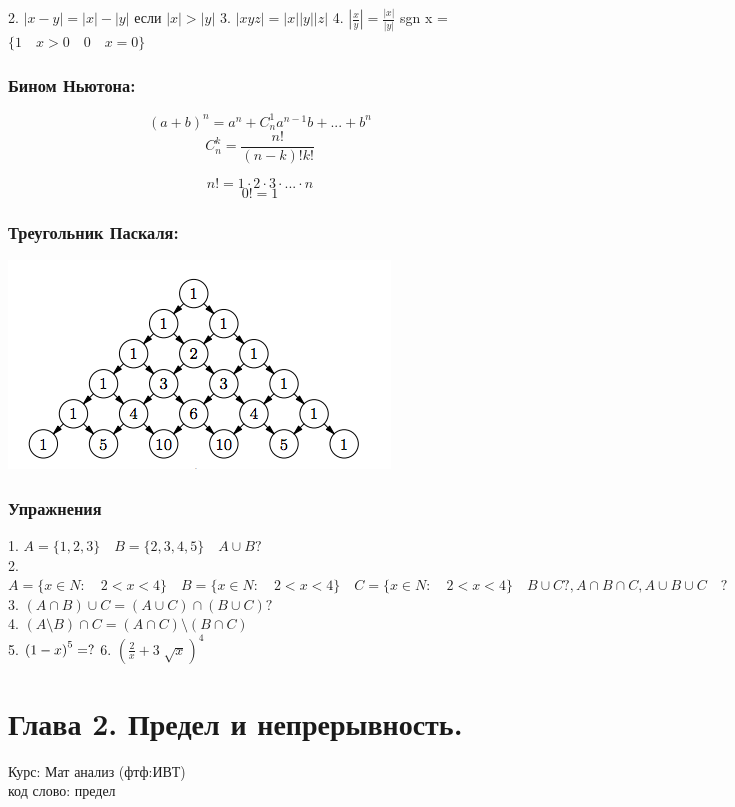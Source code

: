 \documentclass[a4paper, 12pt]{article}
\begin{document}
2. $  |x - y|= |x| - |y|$ если $ |x| > |y| $
3. $ |xyz| = |x||y||z| $
4. $ \left| \frac{x}{y}\right| =  \frac{|x|}{|y|}$
sgn x = $ \{ 1 \quad x>0 \quad 0 \quad x=0\} $\\

\subsubsection*{Бином Ньютона:}
\[
	\left( a + b\right)^n = a^n + C_n^1 a^{n-1}b +...+b^n	
\]
\[
	C_n^k = \frac{n!}{(n-k)!k!}	
\]

\[
	n! = 1\cdot 2 \cdot 3 \cdot ... \cdot n	
\]
\[
	0! = 1	
\]


\subsubsection*{Треугольник Паскаля:}
\includegraphics{Pascal_triangle}

\subsubsection{Упражнения}
1. $ A=\{1,2,3\} \quad B=\{2,3,4,5\} \quad A\cup B ? $\\
2. $ A = \{x \in N: \quad 2 < x < 4\} \quad B = \{x \in N: \quad 2 < x < 4\} \quad C = \{x \in N: \quad 2 < x < 4\} \quad B\cup C ?, A\cap B\cap C,A\cup B\cup C \quad ?$\\
3. $ (A\cap B)\cup C = (A\cup C)\cap(B\cup C)? $\\
4. $ (A \setminus B)\cap C = (A\cap C)\setminus (B\cap C) $\\
5. $ \left( 1-x\right)^5 = ?\\$
6. $ \left(\frac{2}{x} + 3 \sqrt[]{x} \right)^4 $\\
\section{Глава 2. Предел и непрерывность.}
\begin{mdframed}[backgroundcolor=blue!20] 
       Курс: Мат анализ (фтф:ИВТ)\\
       код слово: предел
    \end{mdframed}
\end{document}
